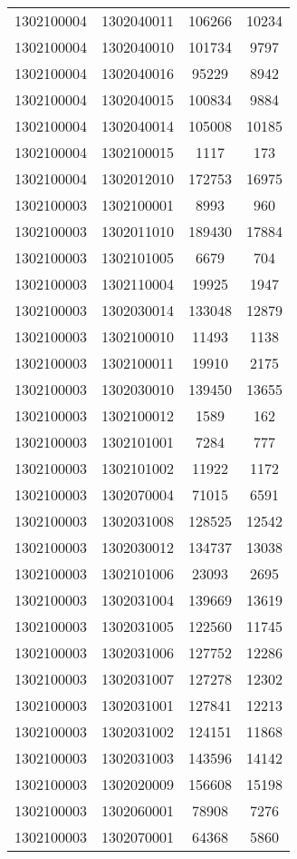\begin{longtable}{llcc}
1302100004 & 1302040011 & 106266 & 10234\\
1302100004 & 1302040010 & 101734 & 9797\\
1302100004 & 1302040016 & 95229 & 8942\\
1302100004 & 1302040015 & 100834 & 9884\\
1302100004 & 1302040014 & 105008 & 10185\\
1302100004 & 1302100015 & 1117 & 173\\
1302100004 & 1302012010 & 172753 & 16975\\
1302100003 & 1302100001 & 8993 & 960\\
1302100003 & 1302011010 & 189430 & 17884\\
1302100003 & 1302101005 & 6679 & 704\\
1302100003 & 1302110004 & 19925 & 1947\\
1302100003 & 1302030014 & 133048 & 12879\\
1302100003 & 1302100010 & 11493 & 1138\\
1302100003 & 1302100011 & 19910 & 2175\\
1302100003 & 1302030010 & 139450 & 13655\\
1302100003 & 1302100012 & 1589 & 162\\
1302100003 & 1302101001 & 7284 & 777\\
1302100003 & 1302101002 & 11922 & 1172\\
1302100003 & 1302070004 & 71015 & 6591\\
1302100003 & 1302031008 & 128525 & 12542\\
1302100003 & 1302030012 & 134737 & 13038\\
1302100003 & 1302101006 & 23093 & 2695\\
1302100003 & 1302031004 & 139669 & 13619\\
1302100003 & 1302031005 & 122560 & 11745\\
1302100003 & 1302031006 & 127752 & 12286\\
1302100003 & 1302031007 & 127278 & 12302\\
1302100003 & 1302031001 & 127841 & 12213\\
1302100003 & 1302031002 & 124151 & 11868\\
1302100003 & 1302031003 & 143596 & 14142\\
1302100003 & 1302020009 & 156608 & 15198\\
1302100003 & 1302060001 & 78908 & 7276\\
1302100003 & 1302070001 & 64368 & 5860\\

\end{longtable}
